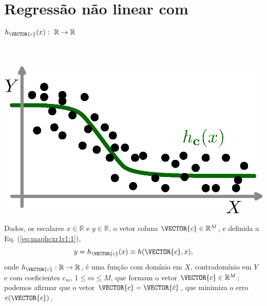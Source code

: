 \section{Regressão não linear com $h_{\VECTOR{c}}(x):~\mathbb{R} \rightarrow \mathbb{R}$ }
\label{sec:theo:maphcxr1r1}



\begin{theorem}
\label{theo:maphcxr1r1}
~\\
\begin{minipage}{0.4\textwidth}
\centering
\includegraphics[width=0.95\linewidth]{chapters/mapeamento/mapeamento-hx-nonlinear.eps} 
\end{minipage}
\begin{minipage}{0.6\textwidth}
Dados,
os escalares $x \in \mathbb{R}$ e $y \in \mathbb{R}$, o vetor coluna $\VECTOR{c} \in \mathbb{R}^M$, e 
definida a Eq. (\ref{eq:maphcxr1r1:1}), 
\begin{equation}\label{eq:maphcxr1r1:1}
y=h_{\VECTOR{c}}(x)\equiv h(\VECTOR{c},x),
\end{equation}
onde $h_{\VECTOR{c}}:\mathbb{R} \rightarrow \mathbb{R}$, é uma função com domínio em $X$, contradomínio em $Y$
e com coeficientes $c_m$, $1 \leq m \leq M$, que formam o vetor $\VECTOR{c} \in \mathbb{R}^{M}$;
podemos afirmar que o vetor $\VECTOR{c}=\VECTOR{\hat{c}}$,
que minimiza o erro $e(\VECTOR{c})$,
\end{minipage}


\end{theorem}
